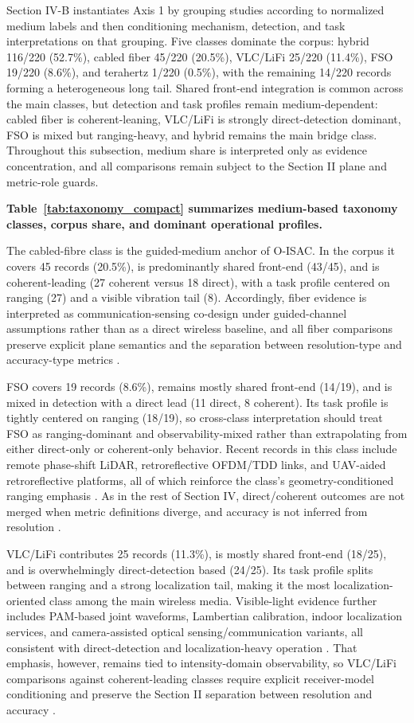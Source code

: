\documentclass[letterpaper,journal]{IEEEtran}
\begin{document}
Section IV-B instantiates Axis 1 by grouping studies according to normalized medium labels and then conditioning mechanism, detection, and task interpretations on that grouping. Five classes dominate the corpus: hybrid 116/220 (52.7\%), cabled fiber 45/220 (20.5\%), VLC/LiFi 25/220 (11.4\%), FSO 19/220 (8.6\%), and terahertz 1/220 (0.5\%), with the remaining 14/220 records forming a heterogeneous long tail. Shared front-end integration is common across the main classes, but detection and task profiles remain medium-dependent: cabled fiber is coherent-leaning, VLC/LiFi is strongly direct-detection dominant, FSO is mixed but ranging-heavy, and hybrid remains the main bridge class. Throughout this subsection, medium share is interpreted only as evidence concentration, and all comparisons remain subject to the Section II plane and metric-role guards.

\textbf{Table~\ref{tab:taxonomy_compact} summarizes medium-based taxonomy classes, corpus share, and dominant operational profiles.}

The cabled-fibre class is the guided-medium anchor of O-ISAC. In the corpus it covers 45 records (20.5\%), is predominantly shared front-end (43/45), and is coherent-leading (27 coherent versus 18 direct), with a task profile centered on ranging (27) and a visible vibration tail (8). Accordingly, fiber evidence is interpreted as communication-sensing co-design under guided-channel assumptions rather than as a direct wireless baseline, and all fiber comparisons preserve explicit plane semantics and the separation between resolution-type and accuracy-type metrics .

FSO covers 19 records (8.6\%), remains mostly shared front-end (14/19), and is mixed in detection with a direct lead (11 direct, 8 coherent). Its task profile is tightly centered on ranging (18/19), so cross-class interpretation should treat FSO as ranging-dominant and observability-mixed rather than extrapolating from either direct-only or coherent-only behavior. Recent records in this class include remote phase-shift LiDAR, retroreflective OFDM/TDD links, and UAV-aided retroreflective platforms, all of which reinforce the class's geometry-conditioned ranging emphasis . As in the rest of Section IV, direct/coherent outcomes are not merged when metric definitions diverge, and accuracy is not inferred from resolution .

VLC/LiFi contributes 25 records (11.3\%), is mostly shared front-end (18/25), and is overwhelmingly direct-detection based (24/25). Its task profile splits between ranging and a strong localization tail, making it the most localization-oriented class among the main wireless media. Visible-light evidence further includes PAM-based joint waveforms, Lambertian calibration, indoor localization services, and camera-assisted optical sensing/communication variants, all consistent with direct-detection and localization-heavy operation . That emphasis, however, remains tied to intensity-domain observability, so VLC/LiFi comparisons against coherent-leading classes require explicit receiver-model conditioning and preserve the Section II separation between resolution and accuracy .
\end{document}
